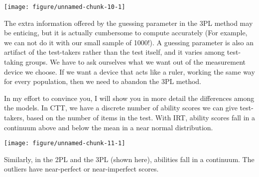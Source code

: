 \documentclass{article}\usepackage[]{graphicx}\usepackage[]{color}
\makeatletter
\newenvironment{kframe}{%
 \def\at@end@of@kframe{}%
 \ifinner\ifhmode%
  \def\at@end@of@kframe{\end{minipage}}%
  \begin{minipage}{\columnwidth}%
 \fi\fi%
 \def\FrameCommand##1{\hskip\@totalleftmargin \hskip-\fboxsep
 \colorbox{shadecolor}{##1}\hskip-\fboxsep
     \hskip-\linewidth \hskip-\@totalleftmargin \hskip\columnwidth}%
 \MakeFramed {\advance\hsize-\width
   \@totalleftmargin\z@ \linewidth\hsize
   \@setminipage}}%
 {\par\unskip\endMakeFramed%
 \at@end@of@kframe}
\newenvironment{knitrout}{}{} %
\makeatother
\begin{document}
\begin{enumerate}
\centering
\begin{knitrout}
\color{fgcolor}\begin{kframe}


{\ttfamily\noindent\itshape\color{messagecolor}{\#\# EM cycles terminated after 500 iterations.}}\end{kframe}

{\centering \texttt{[image: figure/unnamed-chunk-10-1]} 

}



\end{knitrout}
\raggedright
The extra information offered by the guessing parameter in the 3PL method may be enticing, but it is actually cumbersome to compute accurately (For example, we can not do it with our small sample of 1000!). A guessing parameter is also an artifact of the test-takers rather than the test itself, and it varies among test-taking groups. We have to ask ourselves what we want out of the measurement device we choose. If we want a device that acts like a ruler, working the same way for every population, then we need to abandon the 3PL method.
\raggedright

In my effort to convince you, I will show you in more detail the differences among the models. 
In CTT, we have a discrete number of ability scores we can give test-takers, based on the number of items in the test. With IRT, ability scores fall in a continuum above and below the mean in a near normal distribution.

\centering
\begin{knitrout}
\color{fgcolor}

{\centering \texttt{[image: figure/unnamed-chunk-11-1]} 

}



\end{knitrout}
\raggedright
Similarly, in the 2PL and the 3PL (shown here), abilities fall in a continuum. The outliers have near-perfect or near-imperfect scores.

\centering
\begin{knitrout}
\color{fgcolor}\begin{kframe}


{\ttfamily\noindent\itshape\color{messagecolor}{\#\# EM cycles terminated after 500 iterations.}}\end{kframe}


\end{knitrout}
\end{enumerate}
\end{document}
